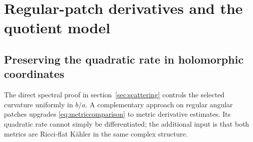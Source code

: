 \section{Regular-patch derivatives and the quotient model}\label{sec:derivatives}

\subsection{Preserving the quadratic rate in holomorphic coordinates}
The direct spectral proof in section~\ref{sec:scattering} controls the
selected curvature uniformly in $b/a$. A complementary approach on
regular angular patches upgrades \eqref{eq:metriccomparison} to metric
derivative estimates. Its quadratic rate cannot simply be differentiated;
the additional input is that both metrics are Ricci-flat K\"ahler in
the same complex structure.

